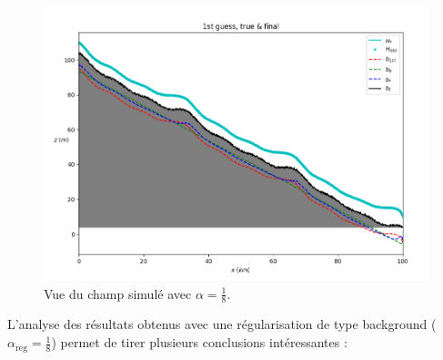 \documentclass{article}
\begin{document}
\begin{figure}[H]

    \begin{minipage}[b]{0.6\linewidth}
        \centering
        \includegraphics[width=\linewidth]{Images_Ayoub/With_Regularisation/Alpha_Const/Graphs/View.png}
        \caption{Vue du champ simulé avec \(\alpha=\tfrac18\).}
        \label{fig:wr-view}
    \end{minipage}
\end{figure}

L'analyse des résultats obtenus avec une régularisation de type background (\(\alpha_{\text{reg}} = \tfrac{1}{8}\)) permet de tirer plusieurs conclusions intéressantes :
\end{document}
